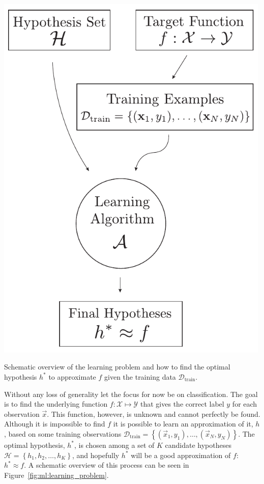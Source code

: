 \begin{marginfigure}
  \includegraphics[width=0.99\textwidth]{figures/learning_problem/learning_problem.pdf}
  \caption[The Learning Problem]
    {Schematic overview of the learning problem and how to find the optimal hypothesis $h^*$ to approximate $f$ given the training data $\mathcal{D}_\mathrm{train}$.
    }
  \label{fig:ml:learning_problem}
\end{marginfigure}

Without any loss of generality let the focus for now be on classification. The goal is to find the underlying  function $f: \mathcal{X} \mapsto \mathcal{Y}$ that gives the correct label $y$ for each observation $\vec{x}$. This function, however, is unknown and cannot perfectly be found. Although it is impossible to find $f$ it is possible to learn an approximation of it, $h$, based on some training observations $\mathcal{D}_\mathrm{train} = \left \{(\vec{x}_1, y_1), \dots, (\vec{x}_N, y_N) \right\}$. The optimal hypothesis, $h^*$, is chosen among a set of $K$ candidate hypotheses $\mathcal{H} = \left\{h_1, h_2, \ldots, h_K  \right\}$, and hopefully $h^*$ will be a good approximation of $f$: $h^* \approx f$. A schematic overview of this process can be seen in Figure~\ref{fig:ml:learning_problem}. 

